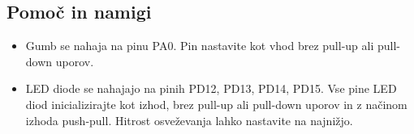 \documentclass[12pt,letterpaper]{article}
\begin{document}
\subsection*{Pomoč in namigi}

\begin{itemize}
    \item Gumb se nahaja na pinu PA0. Pin nastavite kot vhod brez pull-up ali pull-down uporov.
    \item LED diode se nahajajo na pinih PD12, PD13, PD14, PD15. Vse pine LED diod inicializirajte kot izhod, brez pull-up ali pull-down uporov in z načinom izhoda push-pull. Hitrost osveževanja lahko nastavite na najnižjo.
\end{itemize}
\end{document}
